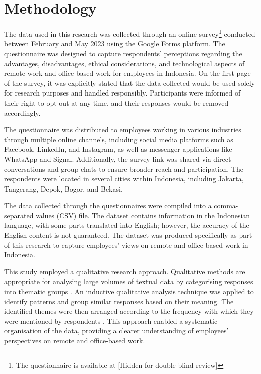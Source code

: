 \documentclass[a4paper, conference]{IEEEtran}
\begin{document}
\section{Methodology}
\label{sec:methodology}

The data used in this research was collected through an online survey\footnote{The questionnaire is available at 
	[Hidden for double-blind review]
} 
conducted between February and May 2023 using the Google Forms platform. The questionnaire was designed to capture respondents' perceptions regarding the advantages, disadvantages, ethical considerations, and technological aspects of remote work and office-based work for employees in Indonesia. On the first page of the survey, it was explicitly stated that the data collected would be used solely for research purposes and handled responsibly. Participants were informed of their right to opt out at any time, and their responses would be removed accordingly.

The questionnaire was distributed to employees working in various industries through multiple online channels, including social media platforms such as Facebook, LinkedIn, and Instagram, as well as messenger applications like WhatsApp and Signal. Additionally, the survey link was shared via direct conversations and group chats to ensure broader reach and participation. The respondents were located in several cities within Indonesia, including Jakarta, Tangerang, Depok, Bogor, and Bekasi.

The data collected through the questionnaires were compiled into a comma-separated values (CSV) file. The dataset contains information in the Indonesian language, with some parts translated into English; however, the accuracy of the English content is not guaranteed. The dataset was produced specifically as part of this research to capture employees' views on remote and office-based work in Indonesia. 

This study employed a qualitative research approach. Qualitative methods are appropriate for analysing large volumes of textual data by categorising responses into thematic groups \cite{hamilton2019qualitative,kumar2018qualitative}. An inductive qualitative analysis technique was applied to identify patterns and group similar responses based on their meaning. The identified themes were then arranged according to the frequency with which they were mentioned by respondents \cite{seixas2018qualitative,turale2020brief}. This approach enabled a systematic organisation of the data, providing a clearer understanding of employees' perspectives on remote and office-based work.
\end{document}
